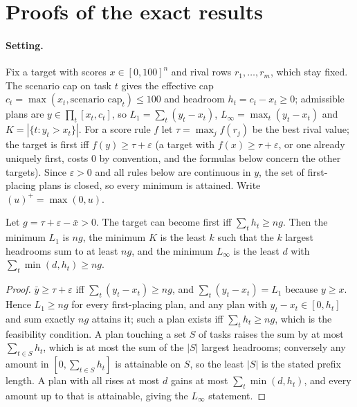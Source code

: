 \section{Proofs of the exact results}
\label{app:proofs}
\paragraph{Setting.}
Fix a target with scores $x\in[0,100]^n$ and rival rows $r_1,\dots,r_m$, which stay fixed. The scenario cap on task $t$ gives the effective cap $c_t=\max(x_t,\text{scenario cap}_t)\le100$ and headroom $h_t=c_t-x_t\ge0$; admissible plans are $y\in\prod_t[x_t,c_t]$, so $L_1=\sum_t(y_t-x_t)$, $L_\infty=\max_t(y_t-x_t)$ and $K=|\{t:y_t>x_t\}|$. For a score rule $f$ let $\tau=\max_j f(r_j)$ be the best rival value; the target is first iff $f(y)\ge\tau+\varepsilon$ (a target with $f(x)\ge\tau+\varepsilon$, or one already uniquely first, costs 0 by convention, and the formulas below concern the other targets). Since $\varepsilon>0$ and all rules below are continuous in $y$, the set of first-placing plans is closed, so every minimum is attained. Write $(u)^+=\max(0,u)$.

\begin{proposition}[Mean]\label{prop:mean}
Let $g=\tau+\varepsilon-\bar x>0$. The target can become first iff $\sum_t h_t\ge n g$. Then the minimum $L_1$ is $n g$, the minimum $K$ is the least $k$ such that the $k$ largest headrooms sum to at least $n g$, and the minimum $L_\infty$ is the least $d$ with $\sum_t\min(d,h_t)\ge n g$.
\end{proposition}
\begin{proof}
$\bar y\ge\tau+\varepsilon$ iff $\sum_t(y_t-x_t)\ge n g$, and $\sum_t(y_t-x_t)=L_1$ because $y\ge x$. Hence $L_1\ge ng$ for every first-placing plan, and any plan with $y_t-x_t\in[0,h_t]$ and sum exactly $ng$ attains it; such a plan exists iff $\sum_t h_t\ge ng$, which is the feasibility condition. A plan touching a set $S$ of tasks raises the sum by at most $\sum_{t\in S}h_t$, which is at most the sum of the $|S|$ largest headrooms; conversely any amount in $[0,\sum_{t\in S}h_t]$ is attainable on $S$, so the least $|S|$ is the stated prefix length. A plan with all rises at most $d$ gains at most $\sum_t\min(d,h_t)$, and every amount up to that is attainable, giving the $L_\infty$ statement.
\end{proof}

